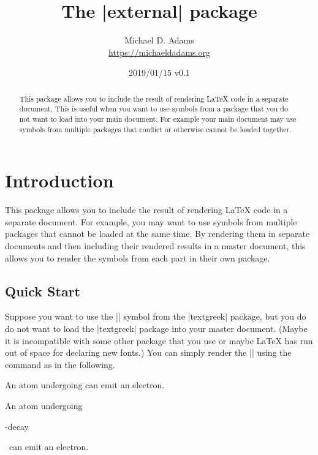 \documentclass[10pt]{ltxdoc}
\begin{document}
\title{The |external| package}
\author{Michael D. Adams\\\url{https://michaeldadams.org}}
\date{2019/01/15 v0.1}
\maketitle

\begin{abstract}
This package allows you to include the result of rendering LaTeX code
in a separate document.
This is useful when you want to use symbols from a package that you do
not want to load into your main document.
For example your main document may use symbols from multiple packages
that conflict or otherwise cannot be loaded together.
\end{abstract}

\section{Introduction}

This package allows you to include the result of rendering LaTeX code
in a separate document.
For example, you may want to use symbols from multiple packages that
cannot be loaded at the same time.
By rendering them in separate documents and then including their
rendered results in a master document, this allows you to render the
symbols from each part in their own package.

\subsection{Quick Start}

Suppose you want to use the |\textbeta| symbol from the |textgreek|
package, but you do do not want to load the |textgreek| package into
your master document.
(Maybe it is incompatible with some other package that you use or maybe
LaTeX has run out of space for declaring new fonts.)
You can simply render the |\textbeta| using the  command
as in the following.

\begin{tcblisting}{}
An atom undergoing
can emit an electron.
\end{tcblisting}

\begin{tcblisting}{}
An atom undergoing
\begin{externalenv}[preamble={\usepackage{textgreek}}]
\textbeta-decay
\end{externalenv}
~can emit an electron.
\end{tcblisting}
\end{document}
